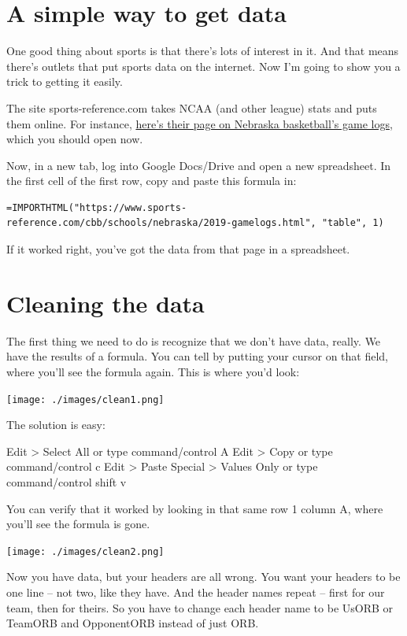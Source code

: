 \documentclass[
  letterpaper,
  DIV=11,
  numbers=noendperiod]{scrreprt}
\begin{document}
\hypertarget{a-simple-way-to-get-data}{%
\section{A simple way to get data}\label{a-simple-way-to-get-data}}

One good thing about sports is that there's lots of interest in it. And
that means there's outlets that put sports data on the internet. Now I'm
going to show you a trick to getting it easily.

The site sports-reference.com takes NCAA (and other league) stats and
puts them online. For instance,
\href{https://www.sports-reference.com/cbb/schools/nebraska/2019-gamelogs.html}{here's
their page on Nebraska basketball's game logs}, which you should open
now.

Now, in a new tab, log into Google Docs/Drive and open a new
spreadsheet. In the first cell of the first row, copy and paste this
formula in:

\begin{verbatim}
=IMPORTHTML("https://www.sports-reference.com/cbb/schools/nebraska/2019-gamelogs.html", "table", 1)
\end{verbatim}

If it worked right, you've got the data from that page in a spreadsheet.

\hypertarget{cleaning-the-data}{%
\section{Cleaning the data}\label{cleaning-the-data}}

The first thing we need to do is recognize that we don't have data,
really. We have the results of a formula. You can tell by putting your
cursor on that field, where you'll see the formula again. This is where
you'd look:

\texttt{[image: ./images/clean1.png]}

The solution is easy:

Edit \textgreater{} Select All or type command/control A Edit
\textgreater{} Copy or type command/control c Edit \textgreater{} Paste
Special \textgreater{} Values Only or type command/control shift v

You can verify that it worked by looking in that same row 1 column A,
where you'll see the formula is gone.

\texttt{[image: ./images/clean2.png]}

Now you have data, but your headers are all wrong. You want your headers
to be one line -- not two, like they have. And the header names repeat
-- first for our team, then for theirs. So you have to change each
header name to be UsORB or TeamORB and OpponentORB instead of just ORB.
\end{document}
